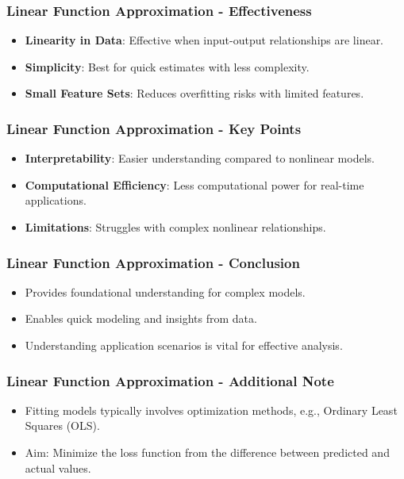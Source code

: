 \documentclass[aspectratio=169]{beamer}
\begin{document}
\begin{frame}[fragile]
    \frametitle{Linear Function Approximation - Effectiveness}
    \begin{itemize}
        \item \textbf{Linearity in Data}: Effective when input-output relationships are linear.
        \item \textbf{Simplicity}: Best for quick estimates with less complexity.
        \item \textbf{Small Feature Sets}: Reduces overfitting risks with limited features.
    \end{itemize}
\end{frame}

\begin{frame}[fragile]
    \frametitle{Linear Function Approximation - Key Points}
    \begin{itemize}
        \item \textbf{Interpretability}: Easier understanding compared to nonlinear models.
        \item \textbf{Computational Efficiency}: Less computational power for real-time applications.
        \item \textbf{Limitations}: Struggles with complex nonlinear relationships.
    \end{itemize}
\end{frame}

\begin{frame}[fragile]
    \frametitle{Linear Function Approximation - Conclusion}
    \begin{itemize}
        \item Provides foundational understanding for complex models.
        \item Enables quick modeling and insights from data.
        \item Understanding application scenarios is vital for effective analysis.
    \end{itemize}
\end{frame}

\begin{frame}[fragile]
    \frametitle{Linear Function Approximation - Additional Note}
    \begin{itemize}
        \item Fitting models typically involves optimization methods, e.g., Ordinary Least Squares (OLS).
        \item Aim: Minimize the loss function from the difference between predicted and actual values.
    \end{itemize}
\end{frame}
\end{document}
